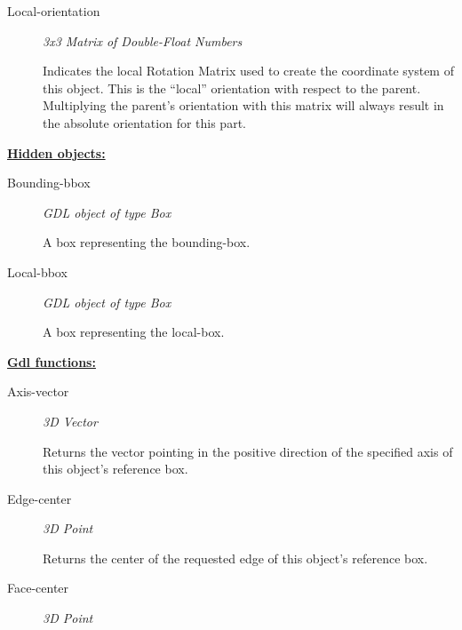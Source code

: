 \documentclass [11pt]{book}
\begin{document}
\begin{itemize}
\begin{description}
\item [Local-orientation]
\emph{3x3 Matrix of Double-Float Numbers}

 Indicates the local Rotation Matrix used
to create the coordinate system of this object. This is the ``local''
orientation with respect to the parent. Multiplying the parent's orientation
with this matrix will always result in the absolute orientation for this part.




\end{description}






\textbf{
\underline{Hidden objects:}}

\begin{description}

\item [Bounding-bbox]
\emph{GDL object of type Box}

 A box representing the bounding-box.




\item [Local-bbox]
\emph{GDL object of type Box}

 A box representing the local-box.




\end{description}






\textbf{
\underline{Gdl functions:}}

\begin{description}

\item [Axis-vector]
\emph{3D Vector}

 Returns the vector pointing in the positive direction of the specified axis of this object's reference box.




\item [Edge-center]
\emph{3D Point}

 Returns the center of the requested edge of this object's reference box.




\item [Face-center]
\emph{3D Point}


\end{description}
\end{itemize}
\end{document}
